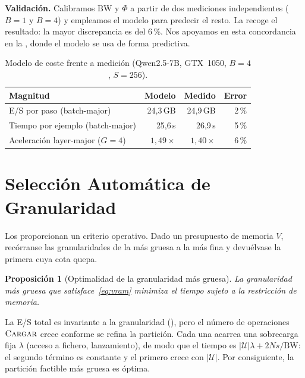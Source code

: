 \documentclass[journal]{IEEEtran}
\newtheorem{proposition}[theorem]{Proposición}
\begin{document}
\textbf{Validación.} Calibramos $\mathrm{BW}$ y $\Phi$ a partir de dos mediciones independientes
($B=1$ y $B=4$) y empleamos el modelo para predecir el resto. La  recoge el
resultado: la mayor discrepancia es del 6\,\%. Nos apoyamos en esta concordancia en la
, donde el modelo se usa de forma predictiva.

\begin{table}[t]
\centering
\caption{Modelo de coste frente a medición (Qwen2.5-7B, GTX~1050, $B=4$, $S=256$).}
\label{tab:cost}
\footnotesize
\begin{tabular}{@{}lrrr@{}}
\toprule
\textbf{Magnitud} & \textbf{Modelo} & \textbf{Medido} & \textbf{Error} \\
\midrule
E/S por paso (batch-major)        & 24,3\,GB & 24,9\,GB & 2\,\% \\
Tiempo por ejemplo (batch-major)  & 25,6\,s  & 26,9\,s  & 5\,\% \\
Aceleración layer-major ($G{=}4$) & $1{,}49\times$ & $1{,}40\times$ & 6\,\% \\
\bottomrule
\end{tabular}
\end{table}

\section{Selección Automática de Granularidad}
\label{sec:auto}

Los  proporcionan un criterio operativo. Dado un presupuesto de memoria
$V$, recórranse las granularidades de la más gruesa a la más fina y devuélvase la primera cuya cota
quepa.

\begin{proposition}[Optimalidad de la granularidad más gruesa]
\label{prop:auto}
La granularidad más gruesa que satisface~\eqref{eq:vram} minimiza el tiempo sujeto a la restricción
de memoria.
\end{proposition}

\begin{IEEEproof}
La E/S total es invariante a la granularidad (), pero el número de operaciones
$\textsc{Cargar}$ crece conforme se refina la partición. Cada una acarrea una sobrecarga fija
$\lambda$ (acceso a fichero, lanzamiento), de modo que el tiempo es
$|\mathcal{U}|\lambda + 2Ns/\mathrm{BW}$: el segundo término es constante y el primero crece con
$|\mathcal{U}|$. Por consiguiente, la partición factible más gruesa es óptima.
\end{IEEEproof}
\end{document}
